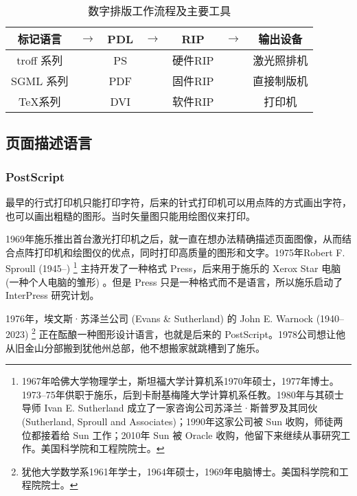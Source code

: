 \begin{table}[!htbp]
\centering
\caption{数字排版工作流程及主要工具}
\label{tab:digital_typesetting}
\begin{tabular}{ccccccc}
    \toprule
    标记语言 & $\to$ & PDL & $\to$ & RIP & $\to$ & 输出设备 \\
    \midrule
    troff 系列 & & PS  & & 硬件RIP & & 激光照排机 \\
    SGML 系列  & & PDF & & 固件RIP & & 直接制版机 \\
    \TeX 系列 & & DVI & & 软件RIP & & 打印机 \\
    \bottomrule
\end{tabular}
\end{table}

\subsection{页面描述语言}

\subsubsection{PostScript}
最早的行式打印机只能打印字符，后来的针式打印机可以用点阵的方式画出字符，也可以画出粗糙的图形。当时矢量图只能用绘图仪来打印。

1969年施乐\indexXerox 推出首台激光打印机之后，就一直在想办法精确描述页面图像，从而结合点阵打印机和绘图仪的优点，同时打印高质量的图形和文字。1975年Robert F. Sproull (1945--)\indexSproull{} \footnote{1967年哈佛大学物理学士，斯坦福大学计算机系1970年硕士，1977年博士。1973--75年供职于施乐，后到卡耐基梅隆大学计算机系任教。1980年与其硕士导师 Ivan E. Sutherland 成立了一家咨询公司苏泽兰·斯普罗及其同伙 (Sutherland, Sproull and Associates)；1990年这家公司被 Sun 收购，师徒两位都接着给 Sun 工作；2010年 Sun 被 Oracle 收购，他留下来继续从事研究工作。美国科学院和工程院院士。} 主持开发了一种格式 Press，后来用于施乐的 Xerox Star 电脑 (一种个人电脑的雏形) 。但是 Press 只是一种格式而不是语言，所以施乐启动了 InterPress 研究计划。

1976年，埃文斯·苏泽兰公司 (Evans \& Sutherland)\indexEvansSutherland{} 的 John E. Warnock (1940--2023)\indexWarnock{} \footnote{犹他大学数学系1961年学士，1964年硕士，1969年电脑博士。美国科学院和工程院院士。} 正在酝酿一种图形设计语言，也就是后来的 PostScript。1978公司想让他从旧金山分部搬到犹他州总部，他不想搬家就跳槽到了施乐。

